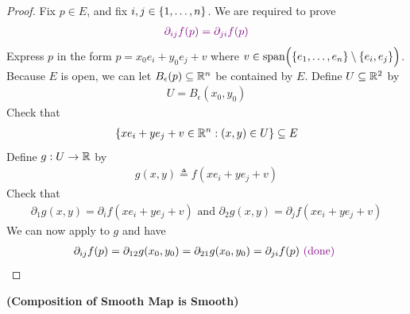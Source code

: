 \documentclass{report}
\begin{document}
\begin{proof}
Fix $p\in E$, and fix $i,j \in \{ 1,\dots ,n \}$. We are required to prove 
\begin{align*}
\textcolor{violet}{\partial_{ij}f(p)=\partial_{ji}f(p)}
\end{align*}
Express $p$ in the form  $p=x_0e_i+y_0e_j+v$ where $v\in\text{span}\Big(\{ e_1,\dots ,e_n \}\setminus \{ e_i,e_j \}\Big)$.\\

Because $E$ is open, we can let $B_\epsilon (p)\subseteq \mathbb{R}^n$ be contained by $E$. Define $U\subseteq \mathbb{R}^2$ by   
\begin{align*}
U= B_{\epsilon }(x_0,y_0)
\end{align*}
Check that 
\begin{align*}
\{ xe_i+ye_j+v \in\mathbb{R}^n :(x,y)\in U \}\subseteq E
\end{align*}
Define $g:U\rightarrow \mathbb{R}$ by 
\begin{align*}
g(x,y)\triangleq f(xe_i+ye_j+v)
\end{align*}
Check that 
\begin{align*}
\partial_1 g(x,y)=\partial_i f(xe_i+ye_j+v)\text{ and }\partial_2g(x,y)=\partial_j f(xe_i+ye_j+v)
\end{align*}
We can now apply  to $g$ and have 
 \begin{align*}
\partial_{ij}f(p)=\partial_{12}g(x_0,y_0)=\partial_{21}g(x_0,y_0)=\partial_{ji}f(p)\textcolor{violet}{\text{ (done) }}
\end{align*}
\end{proof}
\begin{mdframed}

\end{mdframed}
\begin{theorem}
\textbf{(Composition of Smooth Map is Smooth)}
\end{theorem}
\end{document}

